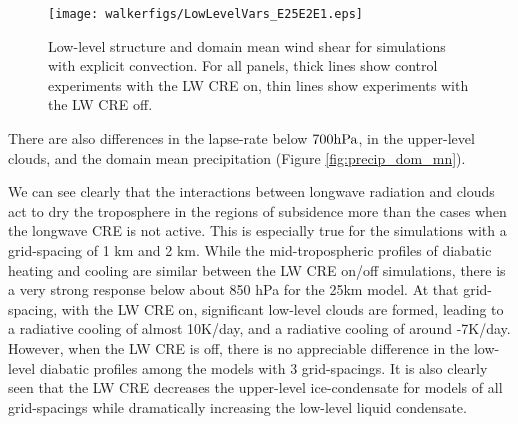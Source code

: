 \documentclass[11pt]{article}   	%
\begin{document}
\begin{figure}
  \centering
    \texttt{[image: walkerfigs/LowLevelVars\_E25E2E1.eps]}
    \caption{Low-level structure and domain mean wind shear for simulations with explicit convection.  
    For all panels, thick lines show control experiments with the LW CRE on, thin lines show experiments
    with the LW CRE off.}
    \label{fig:enthalpy}
\end{figure}
  
  
  


There are also differences in the lapse-rate below $700 \rm{hPa}$, in the upper-level clouds,
and the domain mean precipitation (Figure \ref{fig:precip_dom_mn}).
  
We can see clearly that the interactions between longwave radiation and clouds act to dry the troposphere in the regions of subsidence 
more than the cases when the longwave CRE is not active.  This is especially true for the simulations with a grid-spacing of 1 km 
and 2 km.  While the mid-tropospheric profiles of diabatic heating and cooling are similar between the LW CRE on/off simulations, 
there is a very strong response below about 850 hPa for the 25km model.  At that grid-spacing, with the LW CRE on, significant 
low-level clouds are formed, leading to a radiative cooling of almost 10K/day, and a radiative cooling of around -7K/day.   However, 
when the LW CRE is off, there is no appreciable difference in the low-level diabatic profiles among the models with 3 grid-spacings.   It 
is also clearly seen that the LW CRE decreases the upper-level ice-condensate for models of all grid-spacings while dramatically 
increasing the low-level liquid condensate.  
\end{document}
